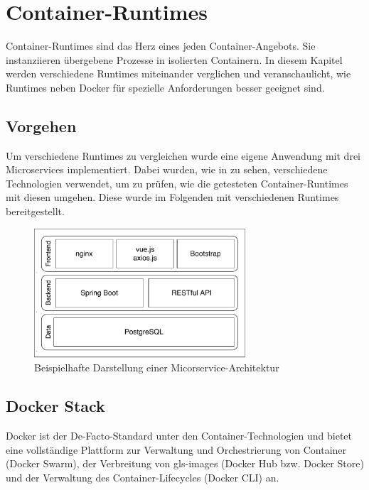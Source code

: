 \chapter{Container-Runtimes}
\label{chap:compCtnrRuntimes}

Container-Runtimes sind das Herz eines jeden Container-Angebots. Sie instanziieren übergebene Prozesse in isolierten Containern. In diesem Kapitel werden verschiedene Runtimes miteinander verglichen und veranschaulicht, wie Runtimes neben Docker für spezielle Anforderungen besser geeignet sind.

\section{Vorgehen}
\label{sec:vorgehen}
Um verschiedene Runtimes zu vergleichen wurde eine eigene Anwendung mit drei Microservices implementiert. Dabei wurden, wie in  zu sehen, verschiedene Technologien verwendet, um zu prüfen, wie die getesteten Container-Runtimes mit diesen umgehen. Diese wurde im Folgenden mit verschiedenen Runtimes bereitgestellt.

\begin{figure}[h]
	\begin{center}
		\includegraphics[width=0.7\textwidth]{bilder/microservice-example-stack.pdf}
		\caption{Beispielhafte Darstellung einer Micorservice-Architektur}
		\label{fig:todosStack}
	\end{center}
\end{figure}

\section{Docker Stack}
\label{sec:compDocker}
Docker ist der De-Facto-Standard unter den Container-Technologien und bietet eine vollständige Plattform zur Verwaltung und Orchestrierung von Container (Docker Swarm), der Verbreitung von \glspl{gls-image} (Docker Hub bzw. Docker Store) und der Verwaltung des Container-Lifecycles (Docker CLI) an.

